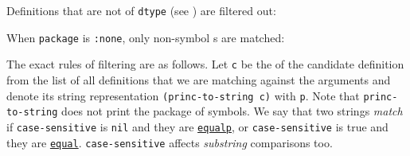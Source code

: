 \begin{itemize}
  Definitions that are not of \texttt{dtype} (see
  ) are
  filtered out:

\begin{Shaded}
\begin{Highlighting}[]
\NormalTok{)}
\end{Highlighting}
\end{Shaded}

  When \texttt{package} is \texttt{:none}, only non-symbol
  s
  are matched:

\begin{Shaded}
\begin{Highlighting}[]
\end{Highlighting}
\end{Shaded}

  The exact rules of filtering are as follows. Let \texttt{c} be the
  of the candidate definition from the list of all definitions that we
  are matching against the arguments and denote its string
  representation \texttt{(princ-to-string\ c)} with \texttt{p}. Note
  that \texttt{princ-to-string} does not print the package of symbols.
  We say that two strings \emph{match} if \texttt{case-sensitive} is
  \texttt{nil} and they are
  \href{http://www.lispworks.com/documentation/HyperSpec/Body/f_equalp.htm}{\texttt{equalp}},
  or \texttt{case-sensitive} is true and they are
  \href{http://www.lispworks.com/documentation/HyperSpec/Body/f_equal.htm}{\texttt{equal}}.
  \texttt{case-sensitive} affects \emph{substring} comparisons too.


\end{itemize}
